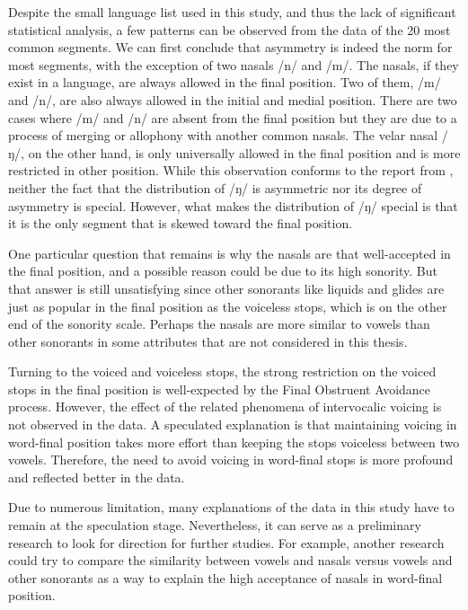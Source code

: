 Despite the small language list used in this study, and thus the lack of significant statistical analysis, a few patterns can be observed from the data of the 20 most common segments.
We can first conclude that asymmetry is indeed the norm for most segments, with the exception of two nasals /n/ and /m/.
The nasals, if they exist in a language, are always allowed in the final position.
Two of them, /m/ and /n/, are also always allowed in the initial and medial position.
There are two cases where /m/ and /n/ are absent from the final position but they are due to a process of merging or allophony with another common nasals.
The velar nasal /ŋ/, on the other hand, is only universally allowed in the final position and is more restricted in other position.
While this observation conforms to the report from \cite{wals-9}, neither the fact that the distribution of /ŋ/ is asymmetric nor its degree of asymmetry is special.
However, what makes the distribution of /ŋ/ special is that it is the only segment that is skewed toward the final position.

\par
One particular question that remains is why the nasals are that well-accepted in the final position, and a possible reason could be due to its high sonority.
But that answer is still unsatisfying since other sonorants like liquids and glides are just as popular in the final position as the voiceless stops, which is on the other end of the sonority scale.
Perhaps the nasals are more similar to vowels than other sonorants in some attributes that are not considered in this thesis.

\par
Turning to the voiced and voiceless stops, the strong restriction on the voiced stops in the final position is well-expected by the Final Obstruent Avoidance process.
However, the effect of the related phenomena of intervocalic voicing is not observed in the data.
A speculated explanation is that maintaining voicing in word-final position takes more effort than keeping the stops voiceless between two vowels.
Therefore, the need to avoid voicing in word-final stops is more profound and reflected better in the data.

\par
Due to numerous limitation, many explanations of the data in this study have to remain at the speculation stage.
Nevertheless, it can serve as a preliminary research to look for direction for further studies.
For example, another research could try to compare the similarity between vowels and nasals versus vowels and other sonorants as a way to explain the high acceptance of nasals in word-final position.
